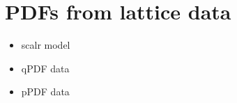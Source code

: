 \chapter{PDFs from lattice data}
\label{ch:lattice}
\begin{itemize}
    \item scalr model
    \item qPDF data
    \item pPDF data
\end{itemize}